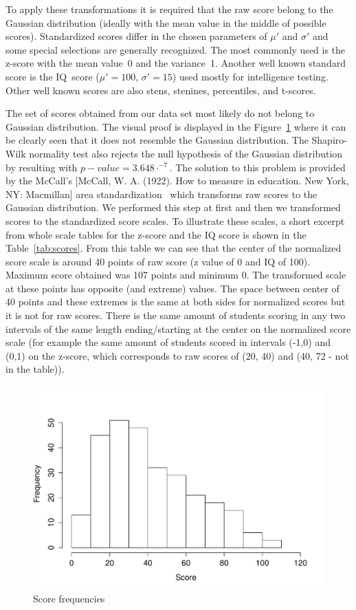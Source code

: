 To apply these transformations it is required that the raw score belong to the Gaussian distribution (ideally with the mean value in the middle of possible scores). Standardized scores differ in the chosen parameters of $\mu'$ and $\sigma'$ and some special selections are generally recognized. The most commonly used is the z-score with the mean value~0 and the variance~1. Another well known standard score is the IQ~score (${\mu' = 100}$, ${\sigma'=15}$) used mostly for intelligence testing. Other well known scores are also stens, stenines, percentiles, and t-scores.

The set of scores obtained from our data set most likely do not belong to Gaussian distribution. The visual proof is displayed in the Figure~\ref{pic:gauss} where it can be clearly seen that it does not resemble the Gaussian distribution. The Shapiro-Wilk normality test also rejects the null hypothesis of the Gaussian distribution by resulting with $p-value = 3.648\cdot^{-7}$. The solution to this problem is provided by the McCall’s [McCall, W. A. (1922). How to measure in education. New York, NY: Macmillan] area standardization~\cite{2011psychometrics} which transforms raw scores to the Gaussian distribution. We performed this step at first and then we transformed scores to the standardized score scales. To illustrate these scales, a short excerpt from whole scale tables for the z-score and the IQ score is shown in the Table~\ref{tab:scores}. From this table we can see that the center of the normalized score scale is around 40 points of raw score (z value of 0 and IQ of 100). Maximum score obtained was 107 points and minimum 0. The transformed scale at these points has opposite (and extreme) values. The space between center of 40 points and these extremes is the same at both sides for normalized scores but it is not for raw scores. There is the same amount of students scoring in any two intervals of the same length ending/starting at the center on the normalized score scale (for example the same amount of students scored in intervals (-1,0) and (0,1) on the z-score, which corresponds to raw scores of (20, 40) and (40, 72 - not in the table)).


\begin{figure}%
\begin{center}
\includegraphics[width=0.8\columnwidth]{obr/hist.pdf}%
\caption{Score frequencies}%
\label{pic:gauss}%
\end{center}
\end{figure}


